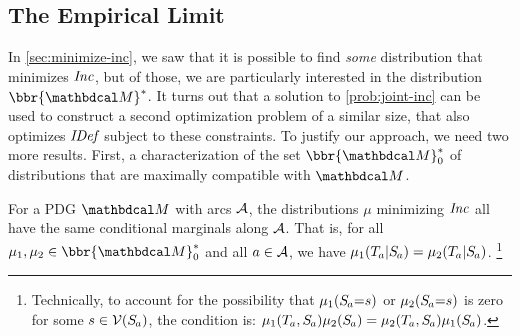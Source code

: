 \documentclass[twoside]{article}
\begin{document}
\subsection{The Empirical Limit}
    \label{sec:empirical-limit}

In \cref{sec:minimize-inc}, we
saw that it is possible to find \emph{some} distribution that minimizes $\mathit{Inc}$,
but of those, we are particularly interested in the distribution $\bbr{\dg M}^*$.
It turns out that a solution to \eqref{prob:joint-inc} can be used to construct a second optimization problem of a similar size, that also optimizes $\mathit{IDef}_{\!}$ subject to these constraints.
To justify our approach, we need two more results.
First, a characterization of the set $\bbr{\dg M}^*_0$ of distributions that are maximally compatible with $\dg M$.


\begin{prop}\label{prop:marginonly}

    For a PDG $\dg M$ with arcs $\mathcal A$,
    the distributions $\mu$ minimizing $\mathit{Inc}$ all have the same conditional
        marginals along $\mathcal A$.
    That is, for all $\mu_1, \mu_2 \in \bbr{\dg M}_0^*$
    and all $a \in \mathcal A$,
    we have
    $\mu_1(\Tgt a | \Src a) = \mu_2(\Tgt a | \Src a)$.%
    \footnote{
        Technically, to account for the possibility that
        $\mu_1(\Src a {=} s)$ or $\mu_2(\Src a {=} s)$ is zero for some $s \in \V(\Src a)$,
        the condition is:
        $\mu_1(\Tgt a, \Src a)\mu_2(\Src a) = \mu_2(\Tgt a, \Src a) \mu_1(\Src a)$.%
    }
\end{prop}
\end{document}
